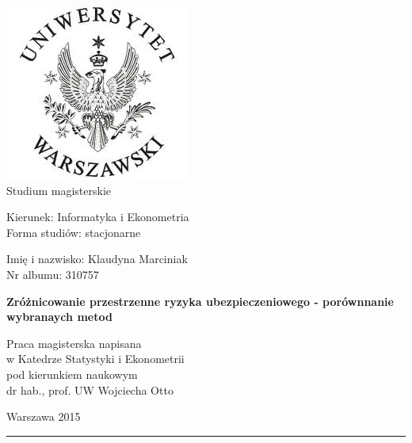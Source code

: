 \documentclass[polish, twoside, 12pt, a4paper]{article}
\theoremstyle{definition}
\theoremstyle{plain}
\theoremstyle{remark}
\begin{document}
\begin{titlepage}
\centering

\includegraphics[scale=0.6]{uw_logo.JPG}
\\[20pt]


\vspace*{0.5cm}
Studium magisterskie\\
\begin{flushleft}
Kierunek: Informatyka i Ekonometria\\
Forma studiów: stacjonarne
\end{flushleft}

\vspace*{.5cm}
\rule{0cm}{1cm}\hfill
\begin{minipage}{9cm}
Imię i nazwisko: Klaudyna Marciniak\\
Nr albumu: 310757
\end{minipage}

\vspace*{1cm}
\begin{minipage}{12cm}
\centering
\Large
\textbf{Zróżnicowanie przestrzenne ryzyka ubezpieczeniowego - porównnanie wybranaych metod}
\end{minipage}

\vspace*{2cm}
\rule{0cm}{1cm}\hfill
\begin{minipage}{9cm}
Praca magisterska napisana\\
w Katedrze Statystyki i Ekonometrii\\
pod kierunkiem naukowym\\
dr hab., prof. UW Wojciecha Otto
\end{minipage}

\vfill
Warszawa 2015
\end{titlepage}

\rule{1ex}{0ex}\clearpage


\cleardoublepage
\tableofcontents
\end{document}
